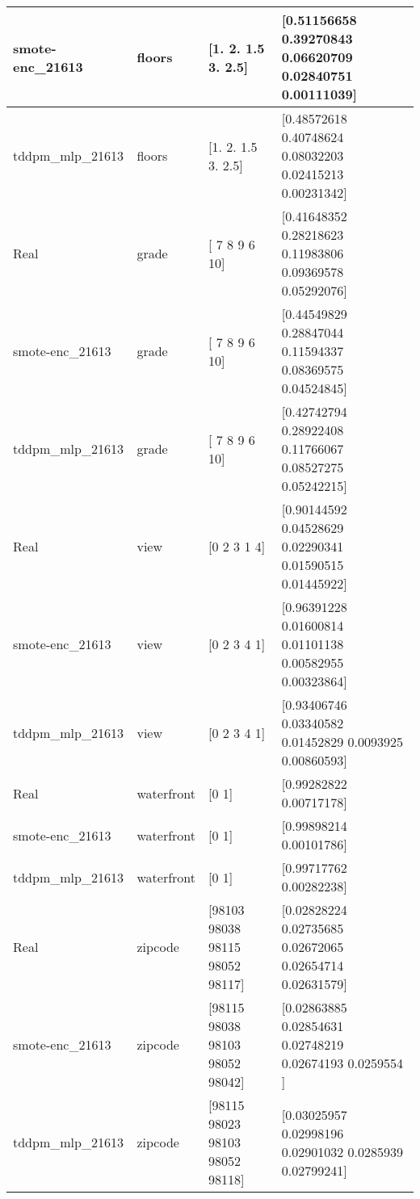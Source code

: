 \begin{longtable}{|l|l|m{10em}|m{10em}|}
    smote-enc\_21613 & floors & [1.  2.  1.5 3.  2.5] & [0.51156658 0.39270843 0.06620709 0.02840751 0.00111039] \\ \hline
    tddpm\_mlp\_21613 & floors & [1.  2.  1.5 3.  2.5] & [0.48572618 0.40748624 0.08032203 0.02415213 0.00231342] \\ \hline
    Real & grade & [ 7  8  9  6 10] & [0.41648352 0.28218623 0.11983806 0.09369578 0.05292076] \\ \hline
    smote-enc\_21613 & grade & [ 7  8  9  6 10] & [0.44549829 0.28847044 0.11594337 0.08369575 0.04524845] \\ \hline
    tddpm\_mlp\_21613 & grade & [ 7  8  9  6 10] & [0.42742794 0.28922408 0.11766067 0.08527275 0.05242215] \\ \hline
    Real & view & [0 2 3 1 4] & [0.90144592 0.04528629 0.02290341 0.01590515 0.01445922] \\ \hline
    smote-enc\_21613 & view & [0 2 3 4 1] & [0.96391228 0.01600814 0.01101138 0.00582955 0.00323864] \\ \hline
    tddpm\_mlp\_21613 & view & [0 2 3 4 1] & [0.93406746 0.03340582 0.01452829 0.0093925  0.00860593] \\ \hline
    Real & waterfront & [0 1] & [0.99282822 0.00717178] \\\hline
    smote-enc\_21613 & waterfront & [0 1] & [0.99898214 0.00101786] \\ \hline
    tddpm\_mlp\_21613 & waterfront & [0 1] & [0.99717762 0.00282238] \\ \hline
    Real & zipcode & [98103 98038 98115 98052 98117] & [0.02828224 0.02735685 0.02672065 0.02654714 0.02631579] \\ \hline
    smote-enc\_21613 & zipcode & [98115 98038 98103 98052 98042] & [0.02863885 0.02854631 0.02748219 0.02674193 0.0259554 ] \\ \hline
    tddpm\_mlp\_21613 & zipcode & [98115 98023 98103 98052 98118] & [0.03025957 0.02998196 0.02901032 0.0285939  0.02799241] \\ \hline
\end{longtable}
